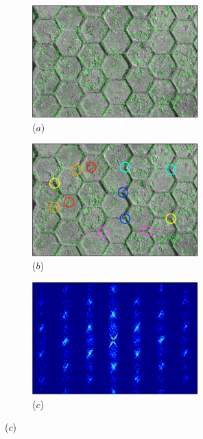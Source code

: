 \begin{figure}
	\centering
	\begin{subfigure}{0.45\textwidth}
		\centering
		\includegraphics[width=0.7\textwidth]{images/regular-1}
		\caption*{($a$)}
	\end{subfigure}
	\hfill
	\begin{subfigure}{0.45\textwidth}
		\centering
		\includegraphics[width=0.7\textwidth]{images/regular-2}
		\caption*{($b$)}
	\end{subfigure}
	\hfill
	\begin{subfigure}{0.45\textwidth}
		\centering
		\includegraphics[width=0.7\textwidth]{images/regular-3}
		\caption*{($c$)}
	\end{subfigure}

\end{figure}
